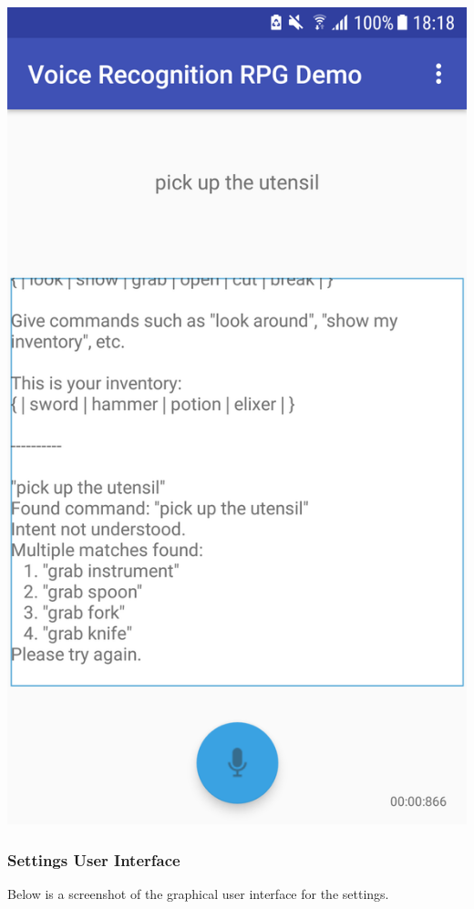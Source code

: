 \documentclass[11pt]{article}
\begin{document}
\begin{center}
\includegraphics[scale=0.25]{utensil-3.png}
\end{center}

\newpage
\subsubsection{Settings User Interface}
\label{appendix:settings}
Below is a screenshot of the graphical user interface for the settings.
\end{document}
